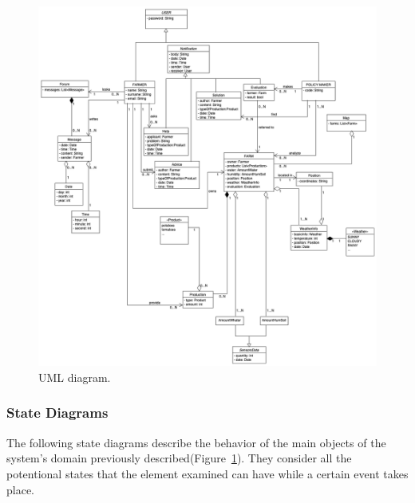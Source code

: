\begin{figure}[H]
    \begin{center}
    \includegraphics[width=1\textwidth]{images/UMLSW2_2.png}
    \caption{UML diagram.}
    \label{fig:uml}
    \end{center}
\end{figure}
\newpage
\subsubsection{State Diagrams}
The following state diagrams describe the behavior of the main objects of the system's domain previously described(Figure~\ref{fig:uml}). 
They consider all the potentional states that the element examined can have 
while a certain event takes place.

